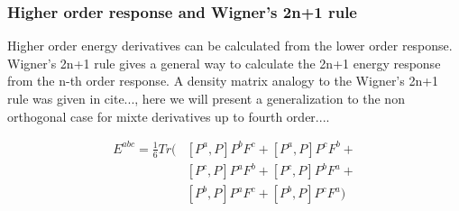 \documentclass[prl,aps,twocolumn,showpacs,twocolumngrid,superbib]{revtex4}
\begin{document}
\subsubsection{Higher order response and Wigner's 2n+1 rule }
Higher order energy derivatives can be calculated from the lower
order response. Wigner's 2n+1 rule gives a general way to calculate the 2n+1
energy response from the n-th order response. A density matrix analogy to
the Wigner's 2n+1 rule was given in cite{...}, here we will present
a generalization to the non orthogonal case for mixte derivatives 
up to fourth order....



\begin{equation}
\begin{split}
  E^{abc}=\frac{1}{6}Tr(&[P^a,P]P^bF^c+[P^a,P]P^cF^b+\\
                        &[P^c,P]P^aF^b+[P^c,P]P^bF^a+\\
                        &[P^b,P]P^aF^c+[P^b,P]P^cF^a)
\end{split}
\end{equation}
\end{document}
